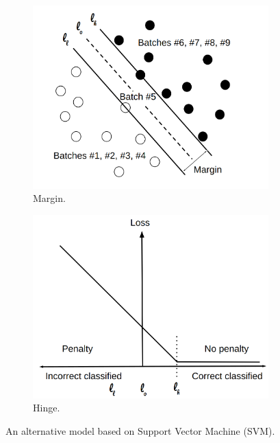 \documentclass{article}
\begin{document}
\begin{figure}[htbp]
\centering
\begin{subfigure}{.45\textwidth}
  \includegraphics[width=1\linewidth]{figures/230803_svm_demo.png}
  \caption{Margin.}
  \label{fig: svm graph demo}
\end{subfigure}
\begin{subfigure}{.45\textwidth}
  \includegraphics[width=1\linewidth]{figures/230803_hinge_function.png}
  \caption{Hinge.}
  \label{fig: hinge function}
\end{subfigure}
\caption{An alternative model based on Support Vector Machine (SVM).}
\label{fig: svm}
\end{figure}
\end{document}
